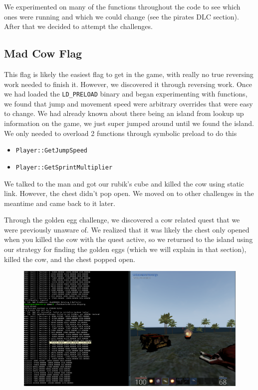 \documentclass[11pt]{article}
\begin{document}
We experimented on many of the functions throughout the code to see which ones were running and which we could change (see the pirates DLC section). After that we decided to attempt the challenges.

\subsection*{Mad Cow Flag}

This flag is likely the easiest flag to get in the game, with really no true reversing work needed to finish it. However, we discovered it through reversing work. Once we had loaded the \texttt{LD\_PRELOAD} binary and began experimenting with functions, we found that jump and movement speed were arbitrary overrides that were easy to change. We had already known about there being an island from lookup up information on the game, we just super jumped around until we found the island. We only needed to overload 2 functions through symbolic preload to do this 
\begin{itemize}
    \item \texttt{Player::GetJumpSpeed}
    \item \texttt{Player::GetSprintMultiplier}
\end{itemize}

We talked to the man and got our rubik's cube and killed the cow using static link. However, the chest didn't pop open. We moved on to other challenges in the meantime and came back to it later.

Through the golden egg challenge, we discovered a cow related quest that we were previously unaware of. We realized that it was likely the chest only opened when you killed the cow with the quest active, so we returned to the island using our strategy for finding the golden eggs (which we will explain in that section), killed the cow, and the chest popped open. 
\begin{figure}[H]
    \centering
    \includegraphics[width=1.00\linewidth]{cow_quest_completed.png}
\end{figure}
\end{document}
